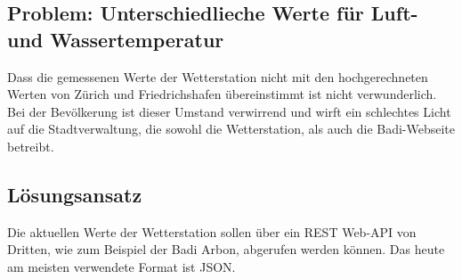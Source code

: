 \subsection*{Problem: Unterschiedlieche Werte für Luft- und Wassertemperatur}
Dass die gemessenen Werte der Wetterstation nicht mit den hochgerechneten Werten von Zürich und Friedrichshafen übereinstimmt ist nicht verwunderlich. Bei der Bevölkerung ist dieser Umstand verwirrend und wirft ein schlechtes Licht auf die Stadtverwaltung, die sowohl die Wetterstation, als auch die Badi-Webseite betreibt.

\subsection*{Lösungsansatz}
Die aktuellen Werte der Wetterstation sollen über ein REST Web-API von Dritten, wie zum Beispiel der Badi Arbon, abgerufen werden können. Das heute am meisten verwendete Format ist JSON.

